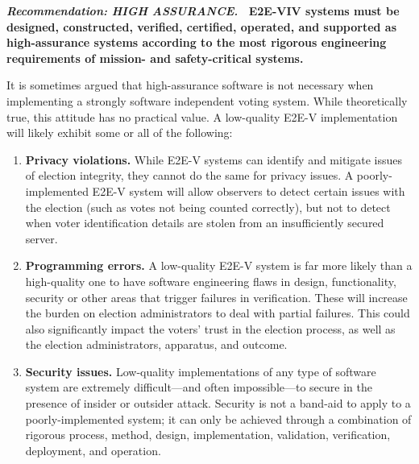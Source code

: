 \vspace{12pt} 

\textbf{\emph{Recommendation: HIGH ASSURANCE.} \ E2E-VIV systems must
  be designed, constructed, verified, certified, operated, and
  supported as high-assurance systems according to the most rigorous
  engineering requirements of mission- and safety-critical systems.}

It is sometimes argued that high-assurance software is not necessary
when implementing a strongly software independent voting system. While
theoretically true, this attitude has no practical value. A
low-quality E2E-V implementation will likely exhibit some or all of
the following:

\begin{enumerate}
\item \textbf{Privacy violations.} While E2E-V systems can identify
  and mitigate issues of election integrity, they cannot do the same
  for privacy issues. A poorly-implemented E2E-V system will allow
  observers to detect certain issues with the election (such as votes
  not being counted correctly), but not to detect when voter
  identification details are stolen from an insufficiently secured
  server.
\item \textbf{Programming errors.} A low-quality E2E-V system is far
  more likely than a high-quality one to have software engineering
  flaws in design, functionality, security or other areas that trigger
  failures in verification. These will increase the burden on election
  administrators to deal with partial failures. This could also
  significantly impact the voters' trust in the election process, as
  well as the election administrators, apparatus, and outcome.
\item \textbf{Security issues.} Low-quality implementations of any
  type of software system are extremely difficult---and often
  impossible---to secure in the presence of insider or outsider
  attack. Security is not a band-aid to apply to a poorly-implemented
  system; it can only be achieved through a combination of rigorous
  process, method, design, implementation, validation, verification,
  deployment, and operation.
\end{enumerate}

